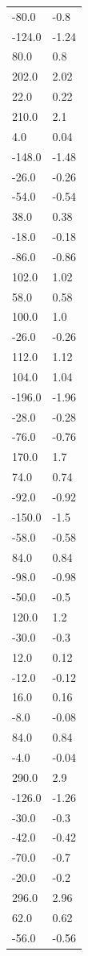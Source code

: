 \begin{longtable}{ll}
-80.0 & -0.8 \\
-124.0 & -1.24 \\
80.0 & 0.8 \\
202.0 & 2.02 \\
22.0 & 0.22 \\
210.0 & 2.1 \\
4.0 & 0.04 \\
-148.0 & -1.48 \\
-26.0 & -0.26 \\
-54.0 & -0.54 \\
38.0 & 0.38 \\
-18.0 & -0.18 \\
-86.0 & -0.86 \\
102.0 & 1.02 \\
58.0 & 0.58 \\
100.0 & 1.0 \\
-26.0 & -0.26 \\
112.0 & 1.12 \\
104.0 & 1.04 \\
-196.0 & -1.96 \\
-28.0 & -0.28 \\
-76.0 & -0.76 \\
170.0 & 1.7 \\
74.0 & 0.74 \\
-92.0 & -0.92 \\
-150.0 & -1.5 \\
-58.0 & -0.58 \\
84.0 & 0.84 \\
-98.0 & -0.98 \\
-50.0 & -0.5 \\
120.0 & 1.2 \\
-30.0 & -0.3 \\
12.0 & 0.12 \\
-12.0 & -0.12 \\
16.0 & 0.16 \\
-8.0 & -0.08 \\
84.0 & 0.84 \\
-4.0 & -0.04 \\
290.0 & 2.9 \\
-126.0 & -1.26 \\
-30.0 & -0.3 \\
-42.0 & -0.42 \\
-70.0 & -0.7 \\
-20.0 & -0.2 \\
296.0 & 2.96 \\
62.0 & 0.62 \\
-56.0 & -0.56 \\

\end{longtable}
